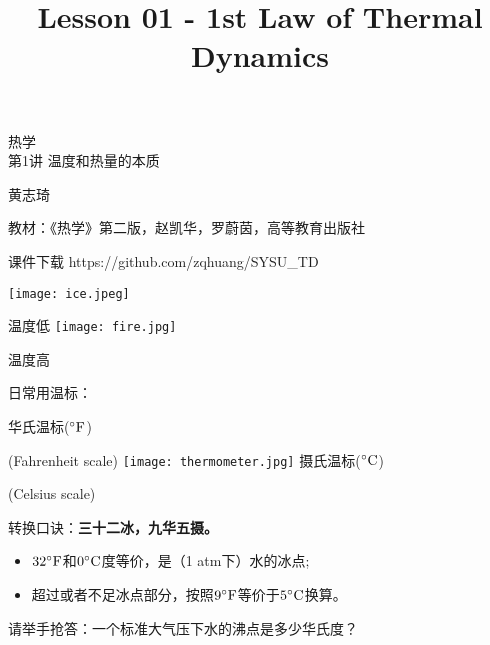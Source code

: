 \documentclass[CJK]{beamer}
\title{Lesson 01 - 1st Law of Thermal Dynamics}
\author{}
\date{}
\begin{document}
\begin{frame}
\begin{center}
\begin{Large}
\bch
热学 \\
第1讲 温度和热量的本质

{\vskip 0.3in}

黄志琦

\ech
\end{Large}
\end{center}

\vskip 0.2in

\bch
教材：《热学》第二版，赵凯华，罗蔚茵，高等教育出版社
\ech

\bch
课件下载
\ech
https://github.com/zqhuang/SYSU\_TD
\end{frame}


\begin{frame}
\bch
{\large 

\skiplines

\texttt{[image: ice.jpeg]}

温度低
\emini
{}
\texttt{[image: fire.jpg]}

温度高
\emini
}
\ech
\end{frame}


\begin{frame}
\bch

日常用温标：
\skiplines

华氏温标(${^\circ \mathrm{F}}$)

(Fahrenheit scale)
\emini
{}
\texttt{[image: thermometer.jpg]}
\emini
{}
摄氏温标($^\circ \mathrm{C}$)

(Celsius scale)
\emini

\ech
\end{frame}


\begin{frame}
\bch
\skipline
转换口诀：{\bf 三十二冰，九华五摄。}
\begin{itemize}
\item{$32{^\circ \mathrm{F}}$和$0^\circ \mathrm{C}$度等价，是（1 atm下）水的冰点;}
\item{超过或者不足冰点部分，按照$9{^\circ \mathrm{F}}$等价于$5^\circ \mathrm{C}$换算。}
\end{itemize}

\skiplines

请举手抢答：一个标准大气压下水的沸点是多少华氏度？
\ech
\end{frame}
\end{document}
